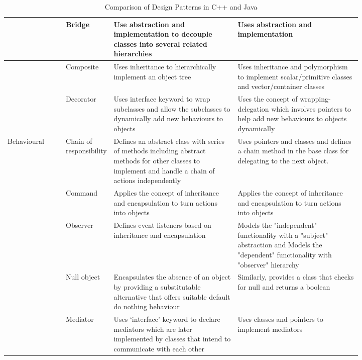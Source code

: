 \documentclass[sigplan,12pt,nonacm=true,review=false]{acmart}
\begin{document}
\begin{table}[htbp]
\begin{tabularx}{\textwidth}{|l|p{0.12\linewidth}|p{0.35\linewidth}|p{0.35\linewidth}|}
    &Bridge&Use abstraction and implementation to decouple classes into several related hierarchies&Uses abstraction and implementation \\ \hline
    
    &Composite&Uses inheritance to hierarchically implement an object tree&Uses inheritance and polymorphism to implement scalar/primitive classes and vector/container classes  \\ \hline
    
    &Decorator&Uses interface keyword to wrap subclasses and allow the subclasses to dynamically add new behaviours to objects&Uses the concept of wrapping-delegation which involves pointers to help add new behaviours to objects dynamically \\ \hline
    
    
    Behavioural&Chain of responsibility&Defines an abstract class with series of methods including abstract methods for other classes to implement and handle a chain of actions independently&Uses pointers and classes and defines a chain method in the base class for delegating to the next object. \\ \hline
    
    &Command&Applies the concept of inheritance and encapsulation to turn actions into objects&Applies the concept of inheritance and encapsulation to turn actions into objects \\ \hline
    &Observer&Defines event listeners based on inheritance and encapsulation&Models the "independent" functionality with a "subject" abstraction and Models the "dependent" functionality with "observer" hierarchy \\ \hline
    
    &Null object&Encapsulates the absence of an object by providing a substitutable alternative that offers suitable default do nothing behaviour&Similarly, provides a class that checks for null and returns a boolean \\ \hline
    
    &Mediator&Uses ‘interface’ keyword to declare mediators which are later implemented by classes that intend to communicate with each other&Uses classes and pointers to implement mediators \\ \hline

    \end{tabularx}
    \caption{Comparison of Design Patterns in C++ and Java}
    \label{tab:comparison}
\end{table}
\end{document}
